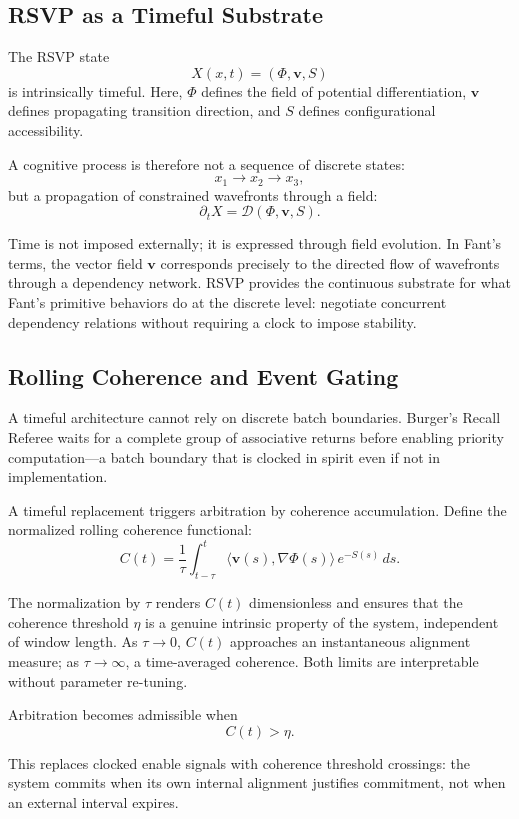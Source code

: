 \documentclass[12pt,a4paper]{article}
\begin{document}
\subsection{RSVP as a Timeful Substrate}

The RSVP state
\[
X(x,t) = (\Phi, \mathbf{v}, S)
\]
is intrinsically timeful. Here, $\Phi$ defines the field of potential differentiation, $\mathbf{v}$ defines propagating transition direction, and $S$ defines configurational accessibility.

A cognitive process is therefore not a sequence of discrete states:
\[
x_1 \to x_2 \to x_3,
\]
but a propagation of constrained wavefronts through a field:
\[
\partial_t X = \mathcal{D}(\Phi,\mathbf{v},S).
\]

Time is not imposed externally; it is expressed through field evolution. In Fant's terms, the vector field $\mathbf{v}$ corresponds precisely to the directed flow of wavefronts through a dependency network. RSVP provides the continuous substrate for what Fant's primitive behaviors do at the discrete level: negotiate concurrent dependency relations without requiring a clock to impose stability.

\subsection{Rolling Coherence and Event Gating}

A timeful architecture cannot rely on discrete batch boundaries. Burger's Recall Referee waits for a complete group of associative returns before enabling priority computation---a batch boundary that is clocked in spirit even if not in implementation.

A timeful replacement triggers arbitration by coherence accumulation. Define the normalized rolling coherence functional:
\[
C(t) = \frac{1}{\tau}
\int_{t-\tau}^{t}
\langle \mathbf{v}(s), \nabla \Phi(s) \rangle \, e^{-S(s)}\,ds.
\]

The normalization by $\tau$ renders $C(t)$ dimensionless and ensures that the coherence threshold $\eta$ is a genuine intrinsic property of the system, independent of window length. As $\tau \to 0$, $C(t)$ approaches an instantaneous alignment measure; as $\tau \to \infty$, a time-averaged coherence. Both limits are interpretable without parameter re-tuning.

Arbitration becomes admissible when
\[
C(t) > \eta.
\]

This replaces clocked enable signals with coherence threshold crossings: the system commits when its own internal alignment justifies commitment, not when an external interval expires.
\end{document}

